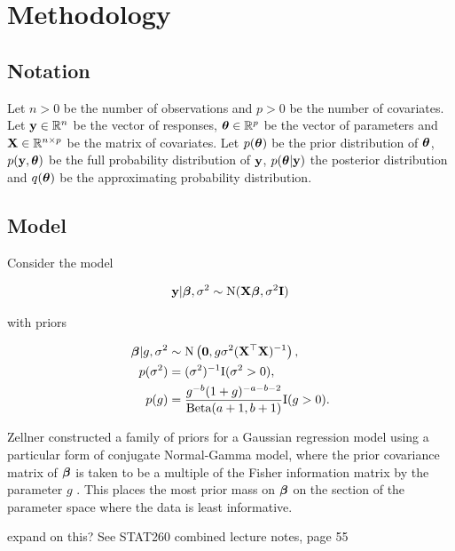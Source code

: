 \documentclass{amsart}[12pt]
\newcommand{\mgc}[1]{{\color{blue}#1}}
\begin{document}
\section{Methodology}
\label{sec:methodology}

\subsection{Notation}


Let $n > 0$ be the number of observations and $p > 0$ be the number of covariates. Let ${\bf y} \in {\mathbb{R}}^n$ be the
vector of responses, ${\boldsymbol \theta} \in {\mathbb{R}}^p$ be the vector of parameters and ${\bf X} \in {\mathbb{R}}^{n \times p}$ be the
matrix of covariates. Let $p({\boldsymbol \theta})$ be the prior distribution of ${\boldsymbol \theta}$, $p({\bf y}, {\boldsymbol \theta})$ be the full
probability distribution of ${\bf y}$, $p({\boldsymbol \theta} | {\bf y})$ the posterior distribution and $q({\boldsymbol \theta})$ be the
approximating probability distribution.

\subsection{Model}

Consider the model

\begin{align*}
	{\bf y}|{\boldsymbol \beta}, \sigma^2 & \sim \text{N}({\bf X} {\boldsymbol \beta}, \sigma^2 {\bf I}) \\
\end{align*}

with priors

\begin{align*}
	{\boldsymbol\beta}|g, \sigma^2 & \sim \text{N}\left({\bf 0}, g\sigma^2 ({\bf X}^\top {\bf X})^{-1}\right), \\
	p(\sigma^2)        & = (\sigma^2)^{-1} \text{I}(\sigma^2 > 0), \\
	p(g) & = \frac{g^{-b} (1 + g)^{- a - b - 2}}{\text{Beta}(a + 1, b + 1)} \text{I}(g > 0).
\end{align*}

Zellner constructed a family of priors for a Gaussian regression model using a particular form of conjugate
Normal-Gamma model, where the prior covariance matrix of ${\boldsymbol \beta}$ is taken to be a multiple of the Fisher
information  matrix by the parameter $g$ \cite{Goel1986}. This places the most prior mass on ${\boldsymbol \beta}$ on the
section of the parameter space where the data is least informative.

\mgc{expand on this? See STAT260 combined lecture notes, page 55}
\end{document}
